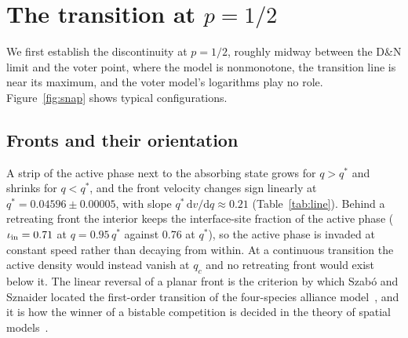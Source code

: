 \documentclass[pre,twocolumn,superscriptaddress,showpacs,floatfix]{revtex4-2}
\newcommand{\qs}{q^{*}}
\newcommand{\ds}{\mathrm{d}}
\begin{document}
\section{The transition at $p = 1/2$}
\label{sec:flagship}

We first establish the discontinuity at $p = 1/2$, roughly midway between the D\&N limit and the
voter point, where the model is nonmonotone, the transition line is near its maximum, and the
voter model's logarithms play no role. Figure~\ref{fig:snap} shows typical configurations.

\subsection{Fronts and their orientation}
\label{sec:fronts}

A strip of the active phase next to the absorbing state grows for $q>\qs$ and shrinks for
$q<\qs$, and the front velocity changes sign linearly at $\qs = 0.04596\pm0.00005$, with slope
$\qs\,\ds v/\ds q\approx 0.21$ (Table~\ref{tab:line}). Behind a retreating front the interior keeps
the interface-site fraction of the active phase ($\iota_{\rm in} = 0.71$ at $q = 0.95\,\qs$ against
0.76 at $\qs$), so the active phase is invaded at constant speed rather than decaying from within.
At a continuous transition the active density would instead vanish at $q_c$ and no retreating
front would exist below it. The linear reversal of a planar front is the criterion by which
Szab\'o and Sznaider located the first-order transition of the four-species alliance
model~\cite{szabo2004}, and it is how the winner of a bistable competition is decided in the
theory of spatial models~\cite{durrett1994,durrett2009}.
\end{document}
